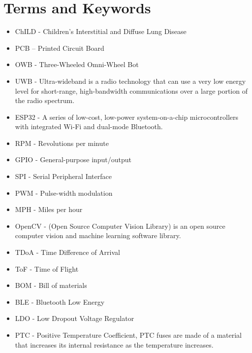 \documentclass{report}
\begin{document}
    \section{Terms and Keywords}
    \begin{itemize}
        \item ChILD - Children's Interstitial and Diffuse Lung Disease
        \item PCB – Printed Circuit Board
        \item OWB - Three-Wheeled Omni-Wheel Bot
        \item UWB - Ultra-wideband is a radio technology that can use a very low energy level for short-range, high-bandwidth communications over a large portion of the radio spectrum.
        \item ESP32 - A series of low-cost, low-power system-on-a-chip microcontrollers with integrated Wi-Fi and dual-mode Bluetooth.
        \item RPM - Revolutions per minute
        \item GPIO - General-purpose input/output
        \item SPI - Serial Peripheral Interface
        \item PWM - Pulse-width modulation
        \item MPH - Miles per hour
        \item OpenCV - (Open Source Computer Vision Library) is an open source computer vision and machine learning software library.
        \item TDoA - Time Difference of Arrival 
        \item ToF - Time of Flight
        \item BOM - Bill of materials
        \item BLE - Bluetooth Low Energy
        \item LDO - Low Dropout Voltage Regulator
        \item PTC - Positive Temperature Coefficient, PTC fuses are made of a material that increases its internal resistance as the temperature increases.
    \end{itemize}

    
    
\end{document}

